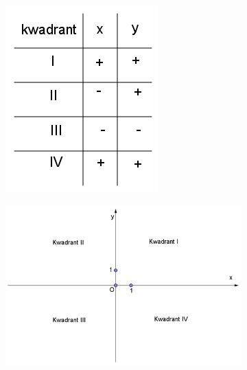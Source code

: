 \begin{figure}[!htb]
	\begin{center}
		\begin{subfigure}{.48\linewidth}
		\centering
		\includegraphics[width=.5\linewidth]{4_opp_inhoud_an_meetk/inputs/AMTekst2Fig5}
		\end{subfigure}
		\begin{subfigure}{.48\linewidth}
		\centering
		\includegraphics[width=\linewidth]{4_opp_inhoud_an_meetk/inputs/AMTekst2Fig6}
		\end{subfigure}
\caption{}
\label{fig4.2.2_fig5}
\end{center}
\end{figure}
